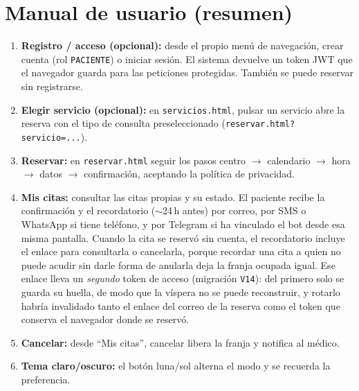 \documentclass[12pt,a4paper]{report}
\begin{document}
\section*{Manual de usuario (resumen)}

\begin{enumerate}
  \item \textbf{Registro / acceso (opcional):} desde el propio menú de navegación, crear cuenta (rol \texttt{PACIENTE}) o iniciar sesión. El sistema devuelve un token JWT que el navegador guarda para las peticiones protegidas. También se puede reservar sin registrarse.
  \item \textbf{Elegir servicio (opcional):} en \texttt{servicios.html}, pulsar un servicio abre la reserva con el tipo de consulta preseleccionado (\texttt{reservar.html?servicio=...}).
  \item \textbf{Reservar:} en \texttt{reservar.html} seguir los pasos centro $\rightarrow$ calendario $\rightarrow$ hora $\rightarrow$ datos $\rightarrow$ confirmación, aceptando la política de privacidad.
  \item \textbf{Mis citas:} consultar las citas propias y su estado. El paciente recibe la confirmación y el recordatorio ($\sim$24\,h antes) por correo, por SMS o WhatsApp si tiene teléfono, y por Telegram si ha vinculado el bot desde esa misma pantalla. Cuando la cita se reservó sin cuenta, el recordatorio incluye el enlace para consultarla o cancelarla, porque recordar una cita a quien no puede acudir sin darle forma de anularla deja la franja ocupada igual. Ese enlace lleva un \emph{segundo} token de acceso (migración \texttt{V14}): del primero solo se guarda su huella, de modo que la víspera no se puede reconstruir, y rotarlo habría invalidado tanto el enlace del correo de la reserva como el token que conserva el navegador donde se reservó.
  \item \textbf{Cancelar:} desde ``Mis citas'', cancelar libera la franja y notifica al médico.
  \item \textbf{Tema claro/oscuro:} el botón luna/sol alterna el modo y se recuerda la preferencia.
\end{enumerate}
\end{document}
